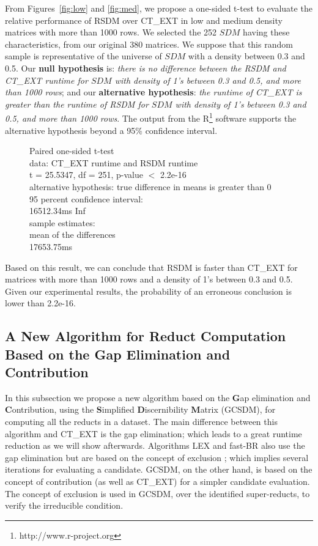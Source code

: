 \documentclass[authoryear,11pt]{elsarticle}
\begin{document}
	From Figures~\ref{fig:low} and \ref{fig:med}, we propose a one-sided t-test to evaluate the relative performance of RSDM over 
	CT\_EXT in low and medium density matrices with more than 1000 rows. We selected the 252 $SDM$ having these characteristics, from 
	our original 380 matrices. We suppose that this random sample is representative of the universe of $SDM$ with a density 
	between 0.3 and 0.5. Our \textbf{null hypothesis} is: \emph{there is no difference between the RSDM and CT\_EXT 
	runtime for $SDM$ with density of 1's between 0.3 and 0.5, and more than 1000 rows}; and our \textbf{alternative hypothesis}: 
	\emph{the runtime of CT\_EXT is greater than the runtime of RSDM for $SDM$ with density of 1's between 0.3 and 0.5, and more than 
	1000 rows}. The output from the R\footnote{http://www.r-project.org} software supports the alternative hypothesis beyond 
	a 95\% confidence interval.
	
	\begin{figure}
		\qquad{}	Paired one-sided t-test\\

		data:  CT\_EXT runtime and RSDM runtime\\
		t = 25.5347, df = 251, p-value $<$ 2.2e-16\\
		alternative hypothesis: true difference in means is greater than 0\\
		95 percent confidence interval:\\
		 16512.34ms  \qquad{}  Inf\\
		sample estimates:\\
		mean of the differences \\
		 \qquad{}    17653.75ms
	\end{figure}
	
	Based on this result, we can conclude that RSDM is faster than CT\_EXT for matrices with more than 1000 rows and a density of 1's
	between 	0.3 and 0.5. Given our experimental results, the probability of an erroneous conclusion is lower than 2.2e-16.

\subsection{A New Algorithm for Reduct Computation Based on the Gap Elimination and Contribution}\label{GCSDM}
	In this subsection we propose a new algorithm based on the \textbf{G}ap elimination and
	\textbf{C}ontribution, using the \textbf{S}implified \textbf{D}iscernibility \textbf{M}atrix (GCSDM), for
	computing all the reducts in a dataset. The main difference between this algorithm and CT\_EXT is the
	gap elimination; which leads to a great runtime reduction as we will show afterwards. Algorithms LEX and
	fast-BR also use the gap elimination but are based on the concept of exclusion \citep{Lias13}; which implies 
	several iterations for evaluating a candidate. GCSDM, on the other hand, is based on the concept of 
	contribution (as well as CT\_EXT) for a simpler candidate evaluation. The concept of exclusion is used in
	GCSDM, over the identified super-reducts, to verify the irreducible condition. 
\end{document}
